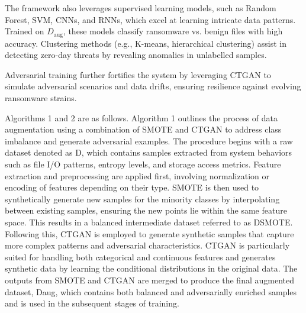 The framework also leverages supervised learning models, such as Random Forest, SVM, CNNs, and RNNs, which excel at learning  intricate data patterns. Trained on \( D_{\text{aug}} \), these models classify ransomware vs. benign files with high accuracy. Clustering methods (e.g., K-means, hierarchical clustering) assist in detecting zero-day threats by revealing anomalies in unlabelled samples.

Adversarial training further fortifies the system by leveraging CTGAN to simulate adversarial scenarios and data drifts, ensuring resilience against evolving ransomware strains.

Algorithms 1 and 2 are as follows. Algorithm 1 outlines the process of data augmentation using a combination of SMOTE and CTGAN to address class imbalance and generate adversarial examples. The procedure begins with a raw dataset denoted as D, which contains samples extracted from system behaviors such as file I/O patterns, entropy levels, and storage access metrics. Feature extraction and preprocessing are applied first, involving normalization or encoding of features depending on their type. SMOTE is then used to synthetically generate new samples for the minority classes by interpolating between existing samples, ensuring the new points lie within the same feature space. This results in a balanced intermediate dataset referred to as DSMOTE. Following this, CTGAN is employed to generate synthetic samples that capture more complex patterns and adversarial characteristics. CTGAN is particularly suited for handling both categorical and continuous features and generates synthetic data by learning the conditional distributions in the original data. The outputs from SMOTE and CTGAN are merged to produce the final augmented dataset, Daug, which contains both balanced and adversarially enriched samples and is used in the subsequent stages of training. 

